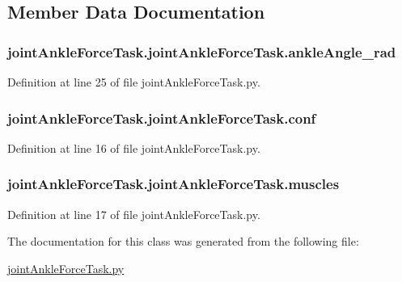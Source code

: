 \subsection{Member Data Documentation}
\subsubsection[{\texorpdfstring{ankle\+Angle\+\_\+rad}{ankleAngle_rad}}]{\setlength{\rightskip}{0pt plus 5cm}joint\+Ankle\+Force\+Task.\+joint\+Ankle\+Force\+Task.\+ankle\+Angle\+\_\+rad}\hypertarget{classjoint_ankle_force_task_1_1joint_ankle_force_task_a573211a402cbd6424a80f53983fb5b89}{}\label{classjoint_ankle_force_task_1_1joint_ankle_force_task_a573211a402cbd6424a80f53983fb5b89}


Definition at line 25 of file joint\+Ankle\+Force\+Task.\+py.

\subsubsection[{\texorpdfstring{conf}{conf}}]{\setlength{\rightskip}{0pt plus 5cm}joint\+Ankle\+Force\+Task.\+joint\+Ankle\+Force\+Task.\+conf}\hypertarget{classjoint_ankle_force_task_1_1joint_ankle_force_task_a5119490fc4e491dad4695eb8e73e8071}{}\label{classjoint_ankle_force_task_1_1joint_ankle_force_task_a5119490fc4e491dad4695eb8e73e8071}


Definition at line 16 of file joint\+Ankle\+Force\+Task.\+py.

\subsubsection[{\texorpdfstring{muscles}{muscles}}]{\setlength{\rightskip}{0pt plus 5cm}joint\+Ankle\+Force\+Task.\+joint\+Ankle\+Force\+Task.\+muscles}\hypertarget{classjoint_ankle_force_task_1_1joint_ankle_force_task_a4f6481ccda853f0660ffb08cda3e31c1}{}\label{classjoint_ankle_force_task_1_1joint_ankle_force_task_a4f6481ccda853f0660ffb08cda3e31c1}


Definition at line 17 of file joint\+Ankle\+Force\+Task.\+py.



The documentation for this class was generated from the following file\+:\begin{DoxyCompactItemize}
\item 
\hyperlink{joint_ankle_force_task_8py}{joint\+Ankle\+Force\+Task.\+py}\end{DoxyCompactItemize}
